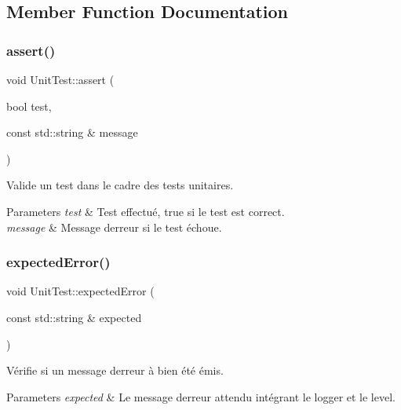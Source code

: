 \subsection{Member Function Documentation}
\mbox{\label{classUnitTest_a94aab90579073ba6e2068bbc05c47c4a}} 
\subsubsection{\texorpdfstring{assert()}{assert()}}
{\footnotesize\ttfamily void Unit\+Test\+::assert (\begin{DoxyParamCaption}\item[{bool}]{test,  }\item[{const std\+::string \&}]{message }\end{DoxyParamCaption})}



Valide un test dans le cadre des tests unitaires. 


\begin{DoxyParams}{Parameters}
{\em test} & Test effectué, true si le test est correct. \\
\hline
{\em message} & Message d\textquotesingle{}erreur si le test échoue. \\
\hline
\end{DoxyParams}
\mbox{\label{classUnitTest_a734b8df5cd0686245f9ce9ccbb73c5ee}} 
\subsubsection{\texorpdfstring{expected\+Error()}{expectedError()}\hspace{0.1cm}{\footnotesize\ttfamily [1/2]}}
{\footnotesize\ttfamily void Unit\+Test\+::expected\+Error (\begin{DoxyParamCaption}\item[{const std\+::string \&}]{expected }\end{DoxyParamCaption})}



Vérifie si un message d\textquotesingle{}erreur à bien été émis. 


\begin{DoxyParams}{Parameters}
{\em expected} & Le message d\textquotesingle{}erreur attendu intégrant le logger et le level. \\
\hline
\end{DoxyParams}
\mbox{\label{classUnitTest_a00a74363b89994348f5025b42f7ea96f}} 
